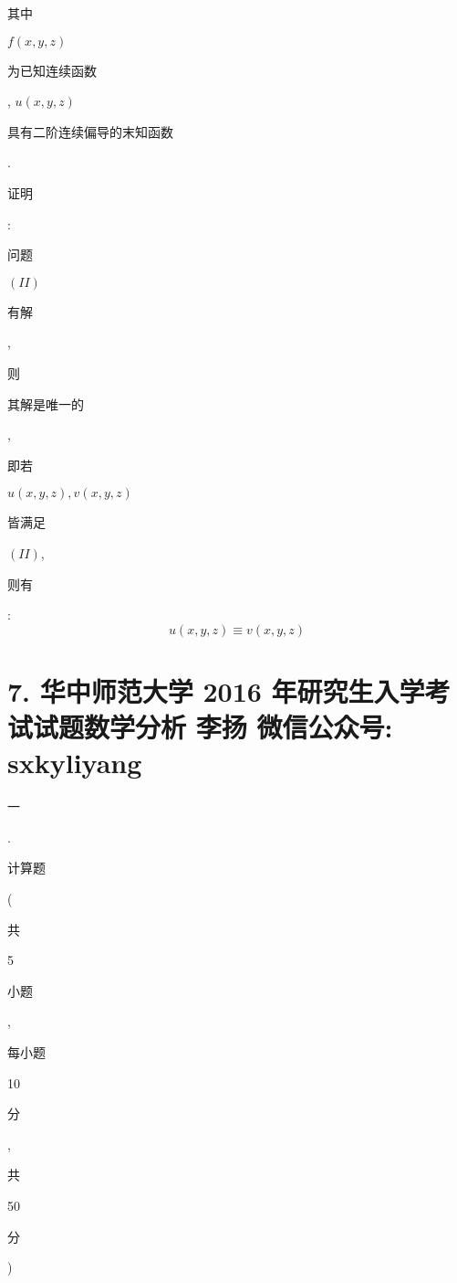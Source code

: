 \documentclass[10pt]{article}
\begin{document}
\begin{CJK}{UTF8}{mj}其中\end{CJK} $f(x, y, z)$ \begin{CJK}{UTF8}{mj}为已知连续函数\end{CJK}, $u(x, y, z)$ \begin{CJK}{UTF8}{mj}具有二阶连续偏导的末知函数\end{CJK}. \begin{CJK}{UTF8}{mj}证明\end{CJK}: \begin{CJK}{UTF8}{mj}问题\end{CJK} $(I I)$ \begin{CJK}{UTF8}{mj}有解\end{CJK}, \begin{CJK}{UTF8}{mj}则\end{CJK} \begin{CJK}{UTF8}{mj}其解是唯一的\end{CJK}, \begin{CJK}{UTF8}{mj}即若\end{CJK} $u(x, y, z), v(x, y, z)$ \begin{CJK}{UTF8}{mj}皆满足\end{CJK} $(I I)$, \begin{CJK}{UTF8}{mj}则有\end{CJK}:
$$
u(x, y, z) \equiv v(x, y, z)
$$

\section{7. 华中师范大学 2016 年研究生入学考试试题数学分析 
 李扬 
 微信公众号: sxkyliyang}
\begin{CJK}{UTF8}{mj}一\end{CJK}. \begin{CJK}{UTF8}{mj}计算题\end{CJK}(\begin{CJK}{UTF8}{mj}共\end{CJK} 5 \begin{CJK}{UTF8}{mj}小题\end{CJK}, \begin{CJK}{UTF8}{mj}每小题\end{CJK} 10 \begin{CJK}{UTF8}{mj}分\end{CJK}, \begin{CJK}{UTF8}{mj}共\end{CJK} 50 \begin{CJK}{UTF8}{mj}分\end{CJK})
\end{document}
